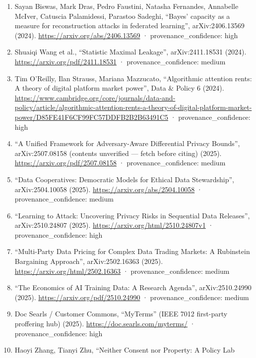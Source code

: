 \documentclass[
  11pt,
]{article}
\begin{document}
\begin{enumerate}
  Saurab Chhachhi, Fei Teng, ``Wasserstein Markets for
  Differentially-Private Data'', arXiv:2412.02609 (2024).
  \url{https://arxiv.org/abs/2412.02609} · provenance\_confidence: high
\item
  Sayan Biswas, Mark Dras, Pedro Faustini, Natasha Fernandes, Annabelle
  McIver, Catuscia Palamidessi, Parastoo Sadeghi, ``Bayes' capacity as a
  measure for reconstruction attacks in federated learning'',
  arXiv:2406.13569 (2024). \url{https://arxiv.org/abs/2406.13569} ·
  provenance\_confidence: high
\item
  Shuaiqi Wang et al., ``Statistic Maximal Leakage'', arXiv:2411.18531
  (2024). \url{https://arxiv.org/pdf/2411.18531} ·
  provenance\_confidence: medium
\item
  Tim O'Reilly, Ilan Strauss, Mariana Mazzucato, ``Algorithmic attention
  rents: A theory of digital platform market power'', Data \& Policy 6
  (2024).
  \url{https://www.cambridge.org/core/journals/data-and-policy/article/algorithmic-attention-rents-a-theory-of-digital-platform-market-power/D85FE41F6CF99FC57DDFB2B2B63491C5}
  · provenance\_confidence: high
\item
  ``A Unified Framework for Adversary-Aware Differential Privacy
  Bounds'', arXiv:2507.08158 (contents unverified --- fetch before
  citing) (2025). \url{https://arxiv.org/pdf/2507.08158} ·
  provenance\_confidence: medium
\item
  ``Data Cooperatives: Democratic Models for Ethical Data Stewardship'',
  arXiv:2504.10058 (2025). \url{https://arxiv.org/abs/2504.10058} ·
  provenance\_confidence: medium
\item
  ``Learning to Attack: Uncovering Privacy Risks in Sequential Data
  Releases'', arXiv:2510.24807 (2025).
  \url{https://arxiv.org/html/2510.24807v1} · provenance\_confidence:
  high
\item
  ``Multi-Party Data Pricing for Complex Data Trading Markets: A
  Rubinstein Bargaining Approach'', arXiv:2502.16363 (2025).
  \url{https://arxiv.org/html/2502.16363} · provenance\_confidence:
  medium
\item
  ``The Economics of AI Training Data: A Research Agenda'',
  arXiv:2510.24990 (2025). \url{https://arxiv.org/pdf/2510.24990} ·
  provenance\_confidence: medium
\item
  Doc Searls / Customer Commons, ``MyTerms'' (IEEE 7012 first-party
  proffering hub) (2025). \url{https://doc.searls.com/myterms/} ·
  provenance\_confidence: high
\item
  Haoyi Zhang, Tianyi Zhu, ``Neither Consent nor Property: A Policy Lab

\end{enumerate}
\end{document}
